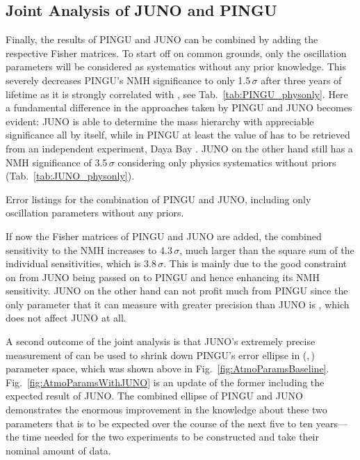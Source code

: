 \subsection{Joint Analysis of JUNO and PINGU}
\label{sec:JUNO_comb}

Finally, the results of PINGU and JUNO can be combined by adding the respective
Fisher matrices. To start off on common grounds, only the oscillation
parameters will be considered as systematics without any prior knowledge. This
severely decreases PINGU's NMH significance to only 1.5\,$\sigma$ after three
years of lifetime as it is strongly correlated with , see
Tab.~\ref{tab:PINGU_physonly}. Here a fundamental difference in the approaches
taken by PINGU and JUNO becomes evident: JUNO is able to determine the mass
hierarchy with appreciable significance all by itself, while in PINGU at least
the value of  has to be retrieved from an independent experiment, \eg
Daya Bay \cite{DayaBay}. JUNO on the other hand still has a NMH significance of
3.5\,$\sigma$ considering only physics systematics without priors
(Tab.~\ref{tab:JUNO_physonly}).

\begin{table}[h!]
 \caption{Error listings for the combination of PINGU and JUNO, including only
  oscillation parameters without any priors.}
 \label{tab:combined_physonly}
 \begin{center}
  \smaller{}
 \end{center}
\end{table}

If now the Fisher matrices of PINGU and JUNO are added, the combined
sensitivity to the NMH increases to 4.3\,$\sigma$, much larger than the square
sum of the individual sensitivities, which is 3.8\,$\sigma$. This is mainly due
to the good constraint on  from JUNO being passed on to PINGU and
hence enhancing its NMH sensitivity. JUNO on the other hand can not profit much
from PINGU since the only parameter that it can measure with greater precision
than JUNO is , which does not affect JUNO at all.

A second outcome of the joint analysis is that JUNO's extremely precise
measurement of  can be used to shrink down PINGU's error ellipse in
(,\,) parameter space, which was shown above in
Fig.~\ref{fig:AtmoParamsBaseline}. Fig.~\ref{fig:AtmoParamsWithJUNO} is an
update of the former including the expected result of JUNO. The combined
ellipse of PINGU and JUNO demonstrates the enormous improvement in the
knowledge about these two parameters that is to be expected over the course of
the next five to ten years---the time needed for the two experiments to be
constructed and take their nominal amount of data.

